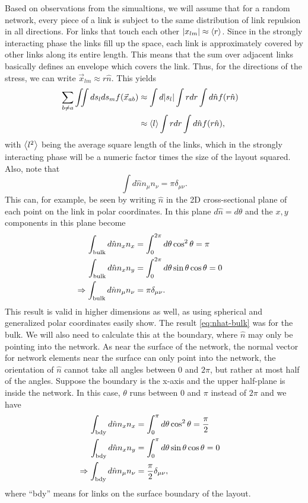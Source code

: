 \documentclass[endfloats,nofootinbib,preprint,floatfix,titlepage,superscriptaddress]{revtex4} %
\begin{document}
Based on observations from the simualtions, we will assume that for a random network, every piece of a link is subject to the same distribution of link repulsion in all directions. 
For links that touch each other $|x_{lm}| \approx \left<r\right>$. 
Since in the strongly interacting phase the links fill up the space, each link is approximately covered by other links along its entire length. This means that the sum over adjacent links basically defines an envelope which covers the link.
Thus, for the directions of the stress,  we can write $\vec{x}_{lm} \approx  r\hat{n}$. 
This yields 
\begin{align}
    \sum_{b\ne a} \iint ds_lds_m f(\vec{x}_{ab}) &  \approx \int d|s_l| \int r dr \int d\hat{n} f(r\hat{n})\cr 
    & \approx  \left<l\right>\int rdr\int d\hat{n} f(r\hat{n}),
    \label{eq:apr-int}
\end{align}
with $\left<l^2\right>$ being the average square length of the links, which in the strongly interacting phase will be a numeric factor times the size of the layout squared. 
Also, note that 
\begin{equation}
\int d\hat{n} n_\mu n_\nu =\pi \delta_{\mu\nu}. 
\end{equation}
This can, for example, be seen by writing $\hat{n}$ in the 2D cross-sectional plane of each point on the link in polar coordinates. 
In this plane $d\hat{n} = d\theta $ and  the $x,y$ components in this plane become
\begin{align}
    \int_\mathrm{bulk} d\hat{n} n_x n_x & = 
    \int_0^{2\pi} d\theta \cos^2 \theta = \pi \cr
    \int_\mathrm{bulk} d\hat{n} n_x n_y & = \int_0^{2\pi} d\theta \sin \theta \cos \theta = 0 \cr 
    \Rightarrow  \int_\mathrm{bulk} d\hat{n} n_\mu n_\nu & = \pi \delta_{\mu\nu}.
    \label{eq:nhat-bulk}
\end{align}
This result is valid in higher dimensions as well, as using spherical and generalized polar coordinates easily show. 
The result \eqref{eq:nhat-bulk} was for the bulk.
We will also need to calculate this at the boundary, where $\hat{n} $ may only be pointing into the network. 
As near the surface of the network, the normal vector for network elements near the surface can only point into the network, the orientation of $\hat{n}$ cannot take all angles between 0 and $2\pi$, but rather at most half of the angles. 
Suppose the boundary is the x-axis and the upper half-plane is inside the network.
In this case, $\theta$ runs between $0$ and $\pi$ instead of $2\pi$ and we have 
\begin{align}
    \int_\mathrm{bdy} d\hat{n} n_x n_x & = 
    \int_0^\pi d\theta \cos^2 \theta = {\pi\over 2}  \cr
    \int_\mathrm{bdy} d\hat{n} n_x n_y & = \int_0^\pi d\theta \sin \theta \cos \theta = 0 \cr 
    \Rightarrow  \int_\mathrm{bdy} d\hat{n} n_\mu n_\nu & = {\pi\over 2} \delta_{\mu\nu}, 
    \label{eq:nhat-bdy}
\end{align}
where ``bdy'' means for links on the surface boundary of the layout. 
\end{document}
